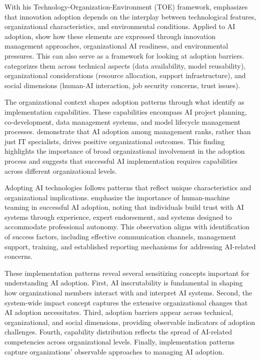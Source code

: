 With his Technology-Organization-Environment (TOE) framework, \cite{Baker2012} emphasizes that innovation adoption depends on the interplay between technological features, organizational characteristics, and environmental conditions. Applied to AI adoption, \cite{Yang2024} show how these elements are expressed through innovation management approaches, organizational AI readiness, and environmental pressures. This can also serve as a framework for looking at adoption barriers. \cite{Cubric2020} categorizes them across technical aspects (data availability, model reusability), organizational considerations (resource allocation, support infrastructure), and social dimensions (human-AI interaction, job security concerns, trust issues).

The organizational context shapes adoption patterns through what \cite{Weber2023} identify as implementation capabilities. These capabilities encompass AI project planning, co-development, data management systems, and model lifecycle management processes. \cite{Alekseeva2020} demonstrate that AI adoption among management ranks, rather than just IT specialists, drives positive organizational outcomes. This finding highlights the importance of broad organizational involvement in the adoption process and suggests that successful AI implementation requires capabilities across different organizational levels.

Adopting AI technologies follows patterns that reflect unique characteristics and organizational implications. \cite{Henry2022} emphasize the importance of human-machine teaming in successful AI adoption, noting that individuals build trust with AI systems through experience, expert endorsement, and systems designed to accommodate professional autonomy. This observation aligns with \cite{Kelley2022} identification of success factors, including effective communication channels, management support, training, and established reporting mechanisms for addressing AI-related concerns.

These implementation patterns reveal several sensitizing concepts important for understanding AI adoption. First, AI inscrutability is fundamental in shaping how organizational members interact with and interpret AI systems. Second, the system-wide impact concept captures the extensive organizational changes that AI adoption necessitates. Third, adoption barriers appear across technical, organizational, and social dimensions, providing observable indicators of adoption challenges. Fourth, capability distribution reflects the spread of AI-related competencies across organizational levels. Finally, implementation patterns capture organizations' observable approaches to managing AI adoption.

